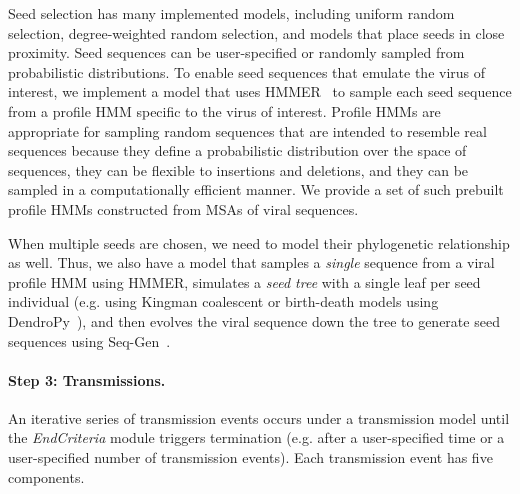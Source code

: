 Seed selection has many implemented models, including uniform random selection, degree-weighted random selection, and models that place seeds in close proximity. Seed sequences can be user-specified or randomly sampled from probabilistic distributions. To enable seed sequences that emulate the virus of interest, we implement a model that uses HMMER~\cite{Eddy1998} to sample each seed sequence from a profile \gls{HMM} specific to the virus of interest. Profile \glspl{HMM} are appropriate for sampling random sequences that are intended to resemble real sequences because they define a probabilistic distribution over the space of sequences, they can be flexible to insertions and deletions, and they can be sampled in a computationally efficient manner. We provide a set of such prebuilt profile \glspl{HMM} constructed from \glspl{MSA} of viral sequences.

When multiple seeds are chosen, we need to model their phylogenetic relationship as well. Thus, we also have a model that samples a \textit{single} sequence from a viral profile HMM using HMMER, simulates a \textit{seed tree} with a single leaf per seed individual (e.g. using Kingman coalescent or birth-death models using DendroPy~\cite{Sukumaran2010}), and then evolves the viral sequence down the tree to generate seed sequences using Seq-Gen~\cite{Rambaut1997}.

\paragraph{Step 3: Transmissions.} An iterative series of transmission events occurs under a transmission model until the \textit{EndCriteria} module triggers termination (e.g. after a user-specified time or a user-specified number of transmission events). Each transmission event has five components.

